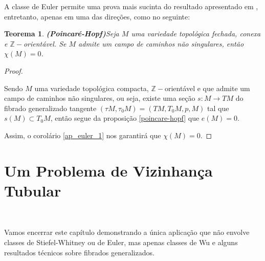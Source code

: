 \documentclass[12pt,oneside]{book} %
\newtheorem{teo}    {\hspace{0.5cm}Teorema}[chapter]
\newcommand{\Z}{\mathbb{Z}}
\begin{document}
\par A classe de Euler permite uma prova mais sucinta do resultado apresentado em \cite{brown}, entretanto, apenas em uma das direções, como no seguinte:

\begin{teo}{\bf (Poincaré-Hopf)}\label{ap_euler_2}
	Seja $M$ uma variedade topológica fechada, conexa e $\Z-$orientável. Se $M$ admite um campo de caminhos não singulares, então $\chi(M)=0$.
\end{teo}

\begin{proof}
	
	\
	
	\par Sendo $M$ uma variedade topológica compacta, $\Z-$orientável e que admite um campo de caminhos não singulares, ou seja, existe uma seção $s:M\to TM$ do fibrado generalizado tangente $(\tau M,\tau_{0}M)=(TM,T_{0}M,p,M)$ tal que $s(M)\subset T_{0}M$, então segue da proposição \ref{poincare-hopf} que $e(M)=0$.
	
	\par Assim, o corolário \ref{ap_euler_1} nos garantirá que $\chi(M)=0$.
	
\end{proof}






\section{Um Problema de Vizinhança Tubular}\label{sec_tubular}

\

\par Vamos encerrar este capítulo demonstrando a única aplicação que não envolve classes de Stiefel-Whitney ou de Euler, mas apenas classes de Wu e alguns resultados técnicos sobre fibrados generalizados.
\end{document}
